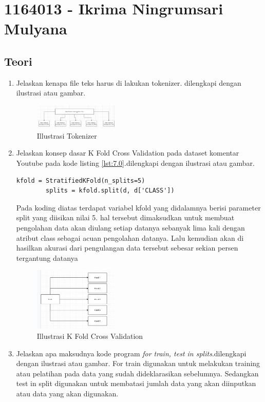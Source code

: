 \section{1164013 - Ikrima Ningrumsari Mulyana}
\subsection{Teori}
\begin{enumerate}
	\item Jelaskan kenapa file teks harus di lakukan tokenizer. dilengkapi dengan ilustrasi atau gambar. 
	\hfill \break
	\begin{figure}[H]
		\includegraphics[width=4cm]{figures/1164013/7/1.png}
		\centering
		\caption{Illustrasi Tokenizer}
	\end{figure}
	\item Jelaskan konsep dasar K Fold Cross Validation pada dataset komentar Youtube pada kode listing \ref{lst:7.0}.dilengkapi dengan ilustrasi atau gambar.
	\hfill \break
	\begin{lstlisting}[caption=K Fold Cross Validation,label={lst:7.0}]
		kfold = StratifiedKFold(n_splits=5)
		splits = kfold.split(d, d['CLASS'])
	\end{lstlisting}
	Pada koding diatas terdapat variabel kfold yang didalamnya berisi parameter split yang diisikan nilai 5. hal tersebut dimaksudkan untuk membuat pengolahan data akan diulang setiap datanya sebanyak lima kali dengan atribut class sebagai acuan pengolahan datanya. Lalu kemudian akan di hasilkan akurasi dari pengulangan data tersebut sebesar sekian persen tergantung datanya
	\begin{figure}[H]
    	\includegraphics[width=4cm]{figures/1164013/7/2.png}
    	\centering
    	\caption{Illustrasi K Fold Cross Validation}
	\end{figure}
	\item Jelaskan apa maksudnya kode program \emph{for train, test in splits}.dilengkapi dengan ilustrasi atau gambar.
	\hfill \break
	For train digunakan untuk melakukan training atau pelatihan pada data yang sudah dideklarasikan sebelumnya. Sedangkan test in split digunakan untuk membatasi jumlah data yang akan diinputkan atau data yang akan digunakan.

\end{enumerate}
